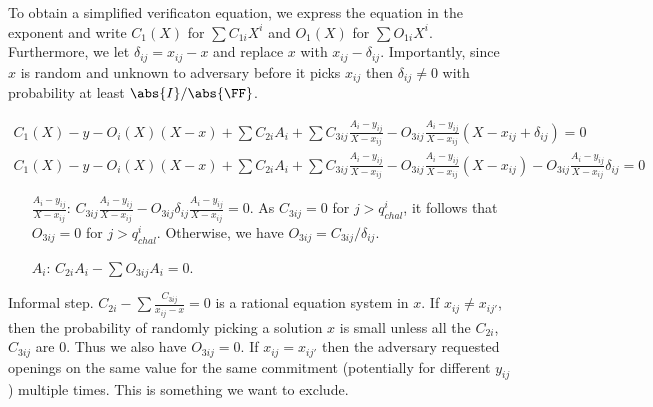 \documentclass[runningheads,11pt]{llncs}
\begin{document}
To obtain a simplified verificaton equation, we express the equation in the exponent
and write $C_{1}(X)$ for $\sum C_{1i} X^{i}$ and $O_{1}(X)$ for $\sum O_{1i} X^{i}$.
Furthermore, we let $\delta_{ij} = x_{i j} - x$ and replace $x$ with
$x_{ij} - \delta_{ij}$. Importantly, since $x$ is random and unknown to adversary
before it picks $x_{i j}$ then $\delta_{i j} \neq 0$ with probability at least
$\infrac{\abs{I}}{\abs{\FF}}$. 

\begin{align*}
  C_{1}(X) - y - O_{i}(X)(X-x) + \sum C_{2i} A_{i} + \sum C_{3ij} \frac{A_{i}-y_{ij}}{X-x_{ij}} - O_{3ij} \frac{A_{i}-y_{ij}}{X-x_{ij}} (X-x_{ij}+\delta_{ij}) = 0\\
  C_{1}(X) - y - O_{i}(X)(X-x) + \sum C_{2i} A_{i} + \sum C_{3ij} \frac{A_{i}-y_{ij}}{X-x_{ij}} - O_{3ij} \frac{A_{i}-y_{ij}}{X-x_{ij}} (X-x_{ij}) - O_{3ij} \frac{A_{i}-y_{ij}}{X-x_{ij}} \delta_{ij} = 0
\end{align*}

\begin{itemize}
\item[$\frac{A_{i}-y_{ij}}{X-x_{ij}}$:]
  $C_{3ij} \frac{A_{i}-y_{ij}}{X-x_{ij}} - O_{{3ij}}\delta_{ij}
  \frac{A_{i}-y_{ij}}{X-x_{ij}}=0$. As $C_{3ij}=0$ for $j>q^{i}_{chal}$, it follows
  that $O_{{3ij}}=0$ for $j>q^{i}_{chal}$. Otherwise, we have
  $O_{3ij}= C_{3ij}/\delta_{ij}$.
\item[$A_{i}$:] $C_{2i} A_{i} - \sum O_{3ij} A_{i}=0$.
\end{itemize}

Informal step. $C_{2i}- \sum \frac{C_{3ij}}{x_{ij}-x} =0$ is a rational equation
system in $x$. If $x_{ij}\neq x_{ij'}$, then the probability of randomly picking a
solution $x$ is small unless all the $C_{2i}$, $C_{3ij}$ are $0$. Thus we also have
$O_{{3ij}}=0$.  If $x_{ij} = x_{ij'}$ then the adversary requested openings on the
same value for the same commitment (potentially for different $y_{ij}$) multiple
times. This is something we want to exclude.

\end{document}
